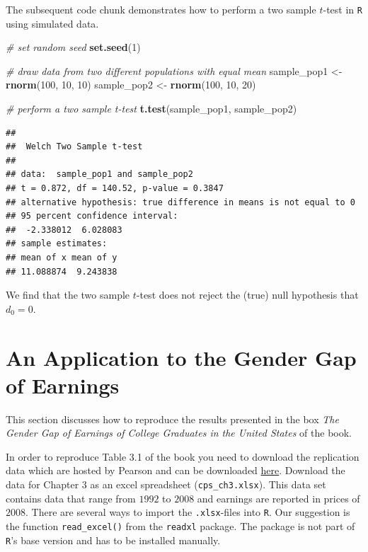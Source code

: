 \documentclass[]{book}
\newenvironment{Shaded}{\begin{snugshade}}{\end{snugshade}}
\newcommand{\KeywordTok}[1]{\textcolor[rgb]{0.13,0.29,0.53}{\textbf{#1}}}
\newcommand{\DecValTok}[1]{\textcolor[rgb]{0.00,0.00,0.81}{#1}}
\newcommand{\StringTok}[1]{\textcolor[rgb]{0.31,0.60,0.02}{#1}}
\newcommand{\CommentTok}[1]{\textcolor[rgb]{0.56,0.35,0.01}{\textit{#1}}}
\newcommand{\NormalTok}[1]{#1}
\theoremstyle{definition}
\theoremstyle{definition}
\theoremstyle{definition}
\theoremstyle{remark}
\begin{document}
The subsequent code chunk demonstrates how to perform a two sample
\(t\)-test in \texttt{R} using simulated data.

\begin{Shaded}
\begin{Highlighting}[]
\CommentTok{# set random seed}
\KeywordTok{set.seed}\NormalTok{(}\DecValTok{1}\NormalTok{)}

\CommentTok{# draw data from two different populations with equal mean}
\NormalTok{sample_pop1 <-}\StringTok{ }\KeywordTok{rnorm}\NormalTok{(}\DecValTok{100}\NormalTok{, }\DecValTok{10}\NormalTok{, }\DecValTok{10}\NormalTok{)}
\NormalTok{sample_pop2 <-}\StringTok{ }\KeywordTok{rnorm}\NormalTok{(}\DecValTok{100}\NormalTok{, }\DecValTok{10}\NormalTok{, }\DecValTok{20}\NormalTok{)}

\CommentTok{# perform a two sample t-test}
\KeywordTok{t.test}\NormalTok{(sample_pop1, sample_pop2)}
\end{Highlighting}
\end{Shaded}

\begin{verbatim}
## 
##  Welch Two Sample t-test
## 
## data:  sample_pop1 and sample_pop2
## t = 0.872, df = 140.52, p-value = 0.3847
## alternative hypothesis: true difference in means is not equal to 0
## 95 percent confidence interval:
##  -2.338012  6.028083
## sample estimates:
## mean of x mean of y 
## 11.088874  9.243838
\end{verbatim}

We find that the two sample \(t\)-test does not reject the (true) null
hypothesis that \(d_0 = 0\).

\section{An Application to the Gender Gap of Earnings}\label{aattggoe}

This section discusses how to reproduce the results presented in the box
\emph{The Gender Gap of Earnings of College Graduates in the United
States} of the book.

In order to reproduce Table 3.1 of the book you need to download the
replication data which are hosted by Pearson and can be downloaded
\href{http://wps.aw.com/aw_stock_ie_3/178/45691/11696965.cw/index.html}{here}.
Download the data for Chapter 3 as an excel spreadsheet
(\texttt{cps\_ch3.xlsx}). This data set contains data that range from
\(1992\) to \(2008\) and earnings are reported in prices of \(2008\).
There are several ways to import the \texttt{.xlsx}-files into
\texttt{R}. Our suggestion is the function \texttt{read\_excel()} from
the \texttt{readxl} package. The package is not part of \texttt{R}'s
base version and has to be installed manually.
\end{document}
